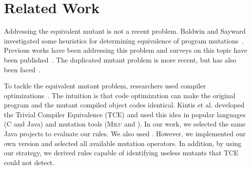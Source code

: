 \chapter{Related Work}
\label{chp:related}

Addressing the equivalent mutant is not a recent problem. Baldwin and Sayward investigated some heuristics for determining equivalence of program mutations~\cite{BALDWIN:1979:1}. Previous works have been addressing this problem and surveys on this topic have been published~\cite{JIA:2011:1, MADEYISKI:2014:1}. The duplicated mutant problem is more recent, but has also been faced~\cite{PAPADAKIS:2015:1, KINTIS:2017:1}.


To tackle the equivalent mutant problem, researchers used compiler optimizations~\cite{BALDWIN:1979:1}. The intuition is that code optimization can make the original program and the mutant compiled object codes identical. Kintis et al. \cite{KINTIS:2017:1} developed the Trivial Compiler Equivalence (TCE) and used this idea in popular languages (C and Java) and mutation tools (\textsc{Milu} and \mujava{}). In our work, we selected the same Java projects to evaluate our rules. We also used \mujava{}. However, we implemented our own \mujava{} version and selected all available mutation operators. In addition, by using our strategy, we derived rules capable of identifying useless mutants that TCE could not detect.



